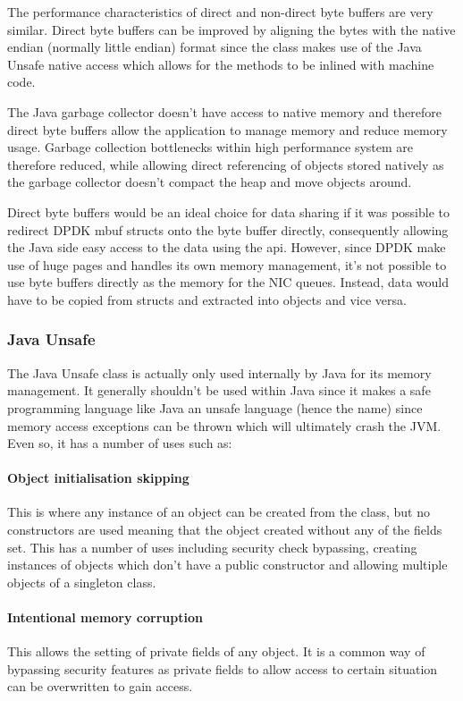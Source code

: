 \documentclass[final_report.tex]{subfiles}
\begin{document}
The performance characteristics of direct and non-direct byte buffers are very similar. Direct byte buffers can be improved by aligning the bytes with the native endian (normally little endian) format since the class makes use of the Java Unsafe native access which allows for the methods to be inlined with machine code.

The Java garbage collector doesn't have access to native memory and therefore direct byte buffers allow the application to manage memory and reduce memory usage. Garbage collection bottlenecks within high performance system are therefore reduced, while allowing direct referencing of objects stored natively as the garbage collector doesn't compact the heap and move objects around.

Direct byte buffers would be an ideal choice for data sharing if it was possible to redirect DPDK mbuf structs onto the byte buffer directly, consequently allowing the Java side easy access to the data using the api. However, since DPDK make use of huge pages and handles its own memory management, it's not possible to use byte buffers directly as the memory for the NIC queues. Instead, data would have to be copied from structs and extracted into objects and vice versa.

\subsubsection{Java Unsafe}
The Java Unsafe class is actually only used internally by Java for its memory management. It generally shouldn't be used within Java since it makes a safe programming language like Java an unsafe language (hence the name) since memory access exceptions can be thrown which will ultimately crash the JVM. Even so, it has a number of uses such as:

\paragraph*{Object initialisation skipping}
This is where any instance of an object can be created from the class, but no constructors are used meaning that the object created without any of the fields set. This has a number of uses including security check bypassing, creating instances of objects which don't have a public constructor and allowing multiple objects of a singleton class.

\paragraph*{Intentional memory corruption}
This allows the setting of private fields of any object. It is a common way of bypassing security features as private fields to allow access to certain situation can be overwritten to gain access.
\end{document}
